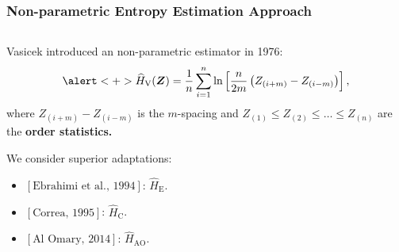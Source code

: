 \documentclass[aspectratio=169,10pt]{beamer}
\begin{document}
\begin{frame} \frametitle{\large{Non-parametric Entropy Estimation Approach}}

 \justifying
\begin{columns}[T,onlytextwidth]
    \begin{column}{.45\textwidth}
			\begin{block}{}\justifying

Vasicek introduced an  non-parametric estimator in 1976: \begin{equation*}
\label{E:Vas}
    \alert<+>{\widehat{H}_{\text{V}}(\bm{Z})=\frac{1}{n}\sum_{i=1}^{n}\ln\left[\frac{n}{2m}\left(Z_{(i+m)}-Z_{(i-m)}\right)\right],}
    \end{equation*} where
\(Z_{(i+m)}-Z_{(i-m)}\) is the \(m\)-spacing and
\(Z_{(1)}\leq Z_{(2)}\leq\ldots\leq Z_{(n)}\) are the \textbf{order statistics.}

\pause

We consider superior adaptations:
\begin{itemize}
\item $\left[\text{Ebrahimi et al., 1994}\right]$: \(\widehat{H}_{\mathrm{E}}\).
\item  $\left[\text{Correa, 1995}\right]$: \(\widehat{H}_{\text{C}}\).
\item  $\left[\text{Al Omary, 2014}\right]$: \(\widehat{H}_{\mathrm{AO}}\).
\end{itemize}
		\end{block}
    \end{column}
		

\end{columns}
\end{frame}
\end{document}
